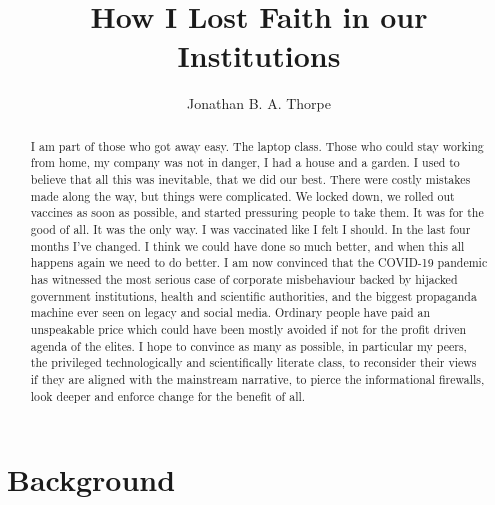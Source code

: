 \documentclass[11pt,a4paper,notitlepage]{report}
\title{How I Lost Faith in our Institutions}
\author{Jonathan B. A. Thorpe}
\begin{document}
 

\begin{titlingpage}
\maketitle
\begin{abstract}
I am part of those who got away easy. The laptop class. Those who could stay working from home, my company was not in danger, I had a house and a garden. I used to believe that all this was inevitable, that we did our best. There were costly mistakes made along the way, but things were complicated. We locked down, we rolled out vaccines as soon as possible, and started pressuring people to take them. It was for the good of all. It was the only way. I was vaccinated like I felt I should. In the last four months I’ve changed. I think we could have done so much better, and when this all happens again we need to do better. I am now convinced that the COVID-19 pandemic has witnessed the most serious case of corporate misbehaviour backed by hijacked government institutions, health and scientific authorities, and the biggest propaganda machine ever seen on legacy and social media. Ordinary people have paid an unspeakable price which could have been mostly avoided if not for the profit driven agenda of the elites. I hope to convince as many as possible, in particular my peers, the privileged technologically and scientifically literate class, to reconsider their views if they are aligned with the mainstream narrative, to pierce the informational firewalls, look deeper and enforce change for the benefit of all. 
\end{abstract}
\end{titlingpage}

\section*{Background}
\end{document}
